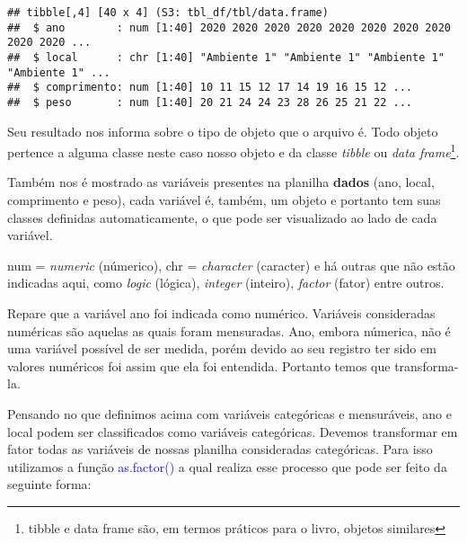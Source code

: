 \documentclass[14pt,titlepage, oneside, openany, a4paper]{book}
\newenvironment{Shaded}{\begin{snugshade}}{\end{snugshade}}
\newcommand{\KeywordTok}[1]{\textcolor[rgb]{0.13,0.29,0.53}{\textbf{#1}}}
\newcommand{\NormalTok}[1]{#1}
\newcommand{\OperatorTok}[1]{\textcolor[rgb]{0.81,0.36,0.00}{\textbf{#1}}}
\newcommand{\StringTok}[1]{\textcolor[rgb]{0.31,0.60,0.02}{#1}}
\begin{document}
\begin{verbatim}
## tibble[,4] [40 x 4] (S3: tbl_df/tbl/data.frame)
##  $ ano        : num [1:40] 2020 2020 2020 2020 2020 2020 2020 2020 2020 2020 ...
##  $ local      : chr [1:40] "Ambiente 1" "Ambiente 1" "Ambiente 1" "Ambiente 1" ...
##  $ comprimento: num [1:40] 10 11 15 12 17 14 19 16 15 12 ...
##  $ peso       : num [1:40] 20 21 24 24 23 28 26 25 21 22 ...
\end{verbatim}

Seu resultado nos informa sobre o tipo de objeto que o arquivo é. Todo objeto pertence a alguma classe neste caso nosso objeto e da classe \emph{tibble} ou \emph{data frame}\footnote{tibble e data frame são, em termos práticos para o livro, objetos similares}.

Também nos é mostrado as variáveis presentes na planilha \textbf{dados} (ano, local, comprimento e peso), cada variável é, também, um objeto e portanto tem suas classes definidas automaticamente, o que pode ser visualizado ao lado de cada variável.

num = \emph{numeric} (númerico), chr = \emph{character} (caracter) e há outras que não estão indicadas aqui, como \emph{logic} (lógica), \emph{integer} (inteiro), \emph{factor} (fator) entre outros.

Repare que a variável ano foi indicada como numérico. Variáveis consideradas numéricas são aquelas as quais foram mensuradas. Ano, embora númerica, não é uma variável possível de ser medida, porém devido ao seu registro ter sido em valores numéricos foi assim que ela foi entendida. Portanto temos que transforma-la.

Pensando no que definimos acima com variáveis categóricas e mensuráveis, ano e local podem ser classificados como variáveis categóricas. Devemos transformar em fator todas as variáveis de nossas planilha consideradas categóricas. Para isso utilizamos a função \textcolor{blue}{as.factor()} a qual realiza esse processo que pode ser feito da seguinte forma:

\begin{Shaded}
\end{Shaded}
\end{document}
